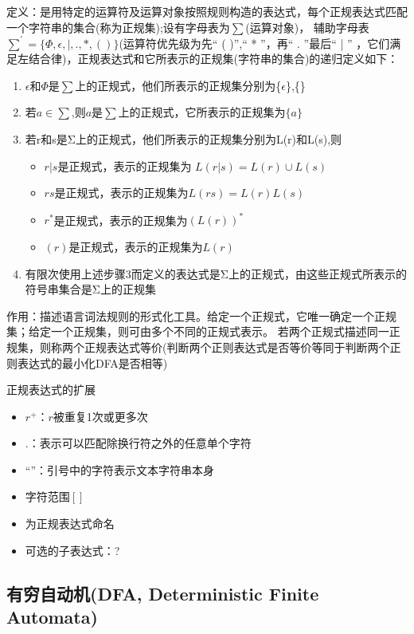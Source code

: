 \documentclass[utf8]{ctexart}
\begin{document}
定义：是用特定的运算符及运算对象按照规则构造的表达式，每个正规表达式匹配一个字符串的集合(称为正规集);设有字母表为$\sum$(运算对象)，
辅助字母表${\sum}^{'}=\{\Phi,\epsilon,|,.,*,()\}$(运算符优先级为先“ ( )”,“ * ”，再“ . ”最后“ | ” ，它们满足左结合律)，正规表达式和它所表示的正规集(字符串的集合)的递归定义如下：
\begin{enumerate}
    \item $\epsilon$和$\Phi$是$\sum$上的正规式，他们所表示的正规集分别为\{$\epsilon$\},\{\}
    \item 若$a \in \sum$,则$a$是$\sum$上的正规式，它所表示的正规集为$\{a\}$
    \item 若r和s是Σ上的正规式，他们所表示的正规集分别为L(r)和L(s),则
    \begin{itemize}
        \item $r|s$是正规式，表示的正规集为 $L(r|s)=L(r) \cup L(s)$
        \item $rs$是正规式，表示的正规集为$L(rs)=L(r)L(s)$
        \item $r^*$是正规式，表示的正规集为$(L(r))^*$
        \item $(r)$是正规式，表示的正规集为$L(r)$
    \end{itemize}
    \item 有限次使用上述步骤3而定义的表达式是Σ上的正规式，由这些正规式所表示的符号串集合是Σ上的正规集 
\end{enumerate}

作用：描述语言词法规则的形式化工具。给定一个正规式，它唯一确定一个正规集；给定一个正规集，则可由多个不同的正规式表示。
若两个正规式描述同一正规集，则称两个正规表达式等价(判断两个正则表达式是否等价等同于判断两个正则表达式的最小化DFA是否相等)


正规表达式的扩展
\begin{itemize}
    \item $r^+$：$r$被重复1次或更多次
    \item .：表示可以匹配除换行符之外的任意单个字符
    \item {``''}：引号中的字符表示文本字符串本身
    \item 字符范围$[]$
    \item 为正规表达式命名
    \item 可选的子表达式：?
\end{itemize}

\subsection{有穷自动机(DFA, Deterministic Finite Automata)}
\end{document}
